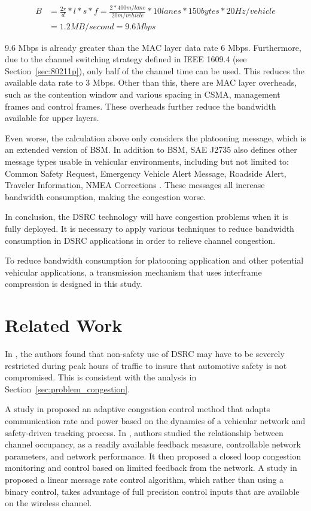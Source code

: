 \documentclass[12pt]{report}
\begin{document}
\begin{equation}
  \begin{split}
    B & = \frac{2r}{d} * l * s * f = \frac{2 * 400m/lane}{20m/vehicle} * 10 lanes * 150 bytes * 20 Hz/vehicle \\
      & = 1.2 MB/second = 9.6 Mbps
  \end{split}
  \label{eq:bandwidth}
\end{equation}

9.6 Mbps is already greater than the MAC layer data rate 6 Mbps. Furthermore, due to the channel switching strategy defined in IEEE 1609.4 (see Section~\ref{sec:80211p}), only half of the channel time can be used. This reduces the available data rate to 3 Mbps. Other than this, there are MAC layer overheads, such as the contention window and various spacing in CSMA, management frames and control frames. These overheads further reduce the bandwidth available for upper layers.

Even worse, the calculation above only considers the platooning message, which is an extended version of BSM. In addition to BSM, SAE J2735 also defines other message types usable in vehicular environments, including but not limited to: Common Safety Request, Emergency Vehicle Alert Message, Roadside Alert, Traveler Information, NMEA Corrections \cite{sae2016j2735,kenney2011}. These messages all increase bandwidth consumption, making the congestion worse.

In conclusion, the DSRC technology will have congestion problems when it is fully deployed. It is necessary to apply various techniques to reduce bandwidth consumption in DSRC applications in order to relieve channel congestion.

To reduce bandwidth consumption for platooning application and other potential vehicular applications, a transmission mechanism that uses interframe compression is designed in this study.

\section{Related Work}

In \cite{Wang2008howmuch}, the authors found that non-safety use of DSRC may have to be severely restricted during peak hours of traffic to insure that automotive safety is not compromised. This is consistent with the analysis in Section~\ref{sec:problem_congestion}.

A study in \cite{huang2010adaptive} proposed an adaptive congestion control method that adapts communication rate and power based on the dynamics of a vehicular network and safety-driven tracking process. In \cite{fallah2010occupancy}, authors studied the relationship between channel occupancy, as a readily available feedback measure, controllable network parameters, and network performance. It then proposed a closed loop congestion monitoring and control based on limited feedback from the network. A study in \cite{Kenney2011linear} proposed a linear message rate control algorithm, which rather than using a binary control, takes advantage of full precision control inputs that are available on the wireless channel.
\end{document}
